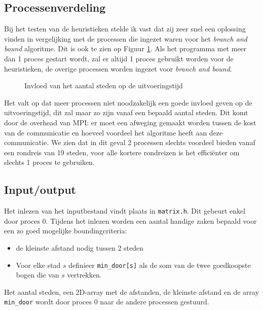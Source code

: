 \documentclass[12pt]{article}
\begin{document}
\subsection{Processenverdeling}
Bij het testen van de heuristieken stelde ik vast dat zij zeer snel een oplossing vinden in vergelijking met de processen die ingezet waren voor het \textit{branch and bound} algoritme. Dit is ook te zien op Figuur \ref{grafiek1}. Als het programma met meer dan 1 proces gestart wordt, zal er altijd 1 proces gebruikt worden voor de heuristieken, de overige processen worden ingezet voor \textit{branch and bound}. 
\begin{figure}[H]
  \begin{center}
    
    \caption{Invloed van het aantal steden op de uitvoeringstijd }
    \label{grafiek1}
  \end{center}
\end{figure}
\noindent
Het valt op dat meer processen niet noodzakelijk een goede invloed geven op de uitvoeringstijd, dit zal maar zo zijn vanaf een bepaald aantal steden. Dit komt door de overhead van MPI: er moet een afweging gemaakt worden tussen de kost van de communicatie en hoeveel voordeel het algoritme heeft aan deze communicatie. We zien dat in dit geval 2 processen slechts voordeel bieden vanaf een rondreis van 19 steden, voor alle kortere rondreizen is het effici\"enter om slechts 1 proces te gebruiken.
\subsection{Input/output}
Het inlezen van het inputbestand vindt plaats in \verb!matrix.h!. Dit gebeurt enkel door proces 0. Tijdens het inlezen worden een aantal handige zaken bepaald voor een zo goed mogelijke boundingcriteria:
\begin{itemize}
\item de kleinste afstand nodig tussen 2 steden
\item Voor elke stad $s$ definieer \verb!min_door[s]! als de som van de twee goedkoopste bogen die van $s$ vertrekken.
\end{itemize}
Het aantal steden, een 2D-array met de afstanden, de kleinste afstand en de array \verb!min_door! wordt door proces 0 naar de andere processen gestuurd.
\end{document}
